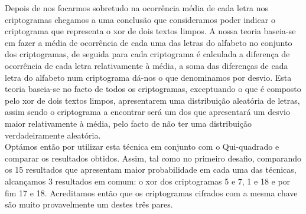 Depois de nos focarmos sobretudo na ocorrência média de cada letra nos criptogramas chegamos a uma conclusão que consideramos poder indicar o criptograma que representa o xor de dois textos limpos.  A nossa teoria baseia-se em fazer a média de ocorrência de cada uma das letras do alfabeto no conjunto dos criptogramas, de seguida para cada criptograma é calculada a diferença de ocorrência de cada letra relativamente à média, a soma das diferenças de cada letra do alfabeto num criptograma dá-nos o que denominamos por desvio.  Esta teoria baseia-se no facto de todos os criptogramas, exceptuando o que é composto pelo xor de dois textos limpos, apresentarem uma distribuição aleatória de letras, assim sendo o criptograma a encontrar será um dos que apresentará um desvio maior relativamente à média, pelo facto de não ter uma distribuição verdadeiramente aleatória. \\
Optámos então por utilizar esta técnica em conjunto com o Qui-quadrado e comparar os resultados obtidos. Assim, tal como no primeiro desafio,  comparando os 15 resultados que apresentam maior probabilidade em cada uma das técnicas, alcançamos 3 resultados em comum: o xor dos criptogramas 5 e 7, 1 e 18 e por fim 17 e 18. Acreditamos então que os criptogramas cifrados com a mesma chave são muito provavelmente um destes três pares. 
